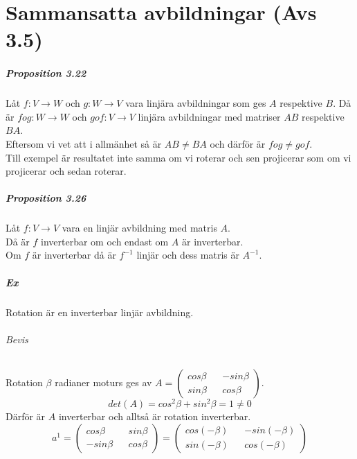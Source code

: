 \chapter{Sammansatta avbildningar (Avs 3.5)}
\paragraph{Proposition 3.22} Låt $f:V\rightarrow W$ och $g:W\rightarrow V$ vara linjära avbildningar som ges $A$ respektive $B$.
Då är $fog:W\rightarrow W$ och $gof:V\rightarrow V$ linjära avbildningar med matriser $AB$ respektive $BA$.\\
Eftersom vi vet att i allmänhet så är $AB\neq BA$ och därför är $fog\neq gof$.\\
Till exempel är resultatet inte samma om vi roterar och sen projicerar som om vi projicerar och sedan roterar.

\paragraph{Proposition 3.26} Låt $f:V\rightarrow V$ vara en linjär avbildning med matris $A$.\\
Då är $f$ inverterbar om och endast om $A$ är inverterbar.\\
Om $f$ är inverterbar då är $f^{-1}$ linjär och dess matris är $A^{-1}$.

\paragraph{Ex} Rotation är en inverterbar linjär avbildning.
\subparagraph{Bevis} Rotation $\beta$ radianer moturs ges av $A=\begin{pmatrix}cos\beta && -sin\beta\\sin\beta && cos\beta\end{pmatrix}$.
\begin{equation*}
    det(A)=cos^{2}\beta + sin^{2}\beta=1\neq 0
\end{equation*}
Därför är $A$ inverterbar och alltså är rotation inverterbar.
\begin{equation*}
    a^{1}=\begin{pmatrix}
        cos\beta&&sin\beta\\-sin\beta&&cos\beta
    \end{pmatrix}=\begin{pmatrix}
        cos(-\beta)&&-sin(-\beta)\\sin(-\beta)&&cos(-\beta)
    \end{pmatrix}
\end{equation*}